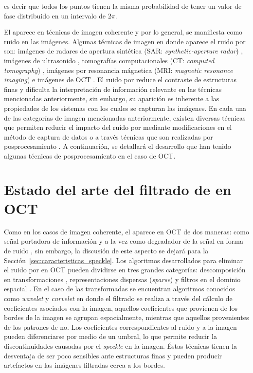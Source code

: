 \noindent es decir que todos los puntos tienen la misma probabilidad de tener un valor de fase distribuido en un intervalo de $2\pi$.


El \speckle aparece en técnicas de imagen coherente y por lo general, se manifiesta como ruido en las imágenes. Algunas técnicas de imagen en donde aparece el ruido por \speckle son: imágenes de radares de apertura sintética (SAR: \textit{synthetic-aperture radar}) \cite{Deledalle2015}, imágenes de ultrasonido \cite{Kalaivani2009}, tomografías computacionales (CT: \textit{computed tomography}) \cite{Sidky2008}, imágenes por resonancia mágnetica (MRI: \textit{magnetic resonance imaging}) \cite{Pizurica2006}  e imágenes de OCT \cite{Schmitt1999}. El ruido por \speckle reduce el contraste de estructuras finas y dificulta la interpretación de información relevante en las técnicas mencionadas anteriormente, sin embargo, su aparición es inherente a las propiedades de los sistemas con los cuales se capturan las imágenes. En cada una de las categorías de imagen mencionadas anteriormente, existen diversas técnicas que permiten reducir el impacto del ruido por \speckle mediante modificaciones en el método de captura de datos \cite{Lee1994} o a  través técnicas que son realizadas por posprocesamiento \cite{Lu2011}. A continuación, se detallará el desarrollo que han tenido algunas técnicas de posprocesamiento en el caso de OCT.

\section{Estado del arte del filtrado de \speckle en OCT}
\label{sec:estado_arte_filt_speckle}

Como en los casos de imagen coherente, el \speckle aparece en OCT de dos maneras: como señal portadora de información y a la vez como degradador de la señal en forma de ruido \cite{Schmitt1999}, sin embargo, la discusión de este aspecto se dejará para la Sección~\ref{sec:caracteristicas_speckle}. Los algoritmos desarrollados para eliminar el ruido por \speckle en OCT pueden dividirse en tres grandes categorías: descomposición en transformaciones \cite{Adler2004, Mayer2012}, representaciones dispersas (\textit{sparse}) \cite{Fang2012} y filtros en el dominio espacial \cite{Yu2016}. En el caso de las transformadas se encuentran algoritmos conocidos como \textit{wavelet} \cite{Adler2004, Mayer2012} y \textit{curvelet} \cite{Jian2009,Xu2013} en donde el filtrado se realiza a través del cálculo de coeficientes asociados con la imagen, aquellos coeficientes que provienen de los bordes de la imagen se agrupan espacialmente, mientras que aquellos provenientes de los patrones de \speckle no. Los coeficientes correspondientes al ruido y a la imagen pueden diferenciarse por medio de un umbral, lo que permite reducir la discontinuidades causadas por el \textit{speckle} en la imagen. Éstas técnicas tienen la desventaja de ser poco sensibles ante estructuras finas y pueden producir artefactos en las imágenes filtradas cerca a los bordes.

